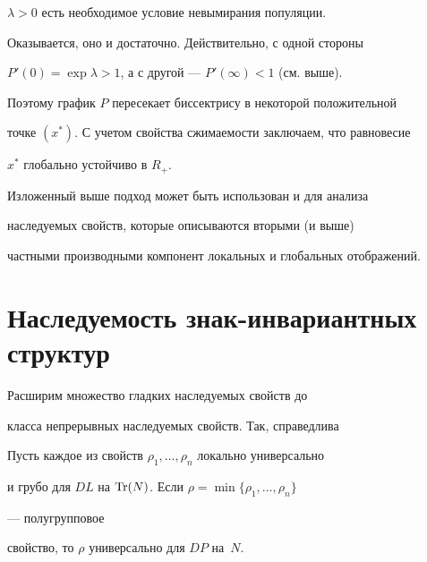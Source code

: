 $\lambda>0$ есть необходимое условие невымирания популяции. 


Оказывается, оно и достаточно. Действительно, с одной стороны 


$P'(0)=\exp\lambda>1$, а с другой --- $P'(\infty)<1$ (см. выше). 


Поэтому график $P$ пересекает биссектрису в некоторой положительной 


точке $(x^*)$. С учетом свойства сжимаемости заключаем, что равновесие 


$x^*$ глобально устойчиво в $R_+$. 


 


Изложенный выше подход может быть использован и для анализа 


наследуемых свойств, которые описываются вторыми (и выше) 


частными производными компонент локальных и глобальных отображений. 


 


\section{Наследуемость знак-инвариантных структур} 


 


Расширим множество гладких наследуемых свойств до 


класса непрерывных наследуемых свойств. Так, справедлива 


 


\begin{lem} 


Пусть каждое из свойств $\rho_1,\dotsc,\rho_n$ локально универсально 


и грубо для $D L$ на $\operatorname{Tr}(N)$. Если $\rho=\min\{\rho_1,\dotsc,\rho_n\}$ 


--- полугрупповое 


свойство, то $\rho$ универсально для $D P$ на~$N$. 


\end{lem} 


 


